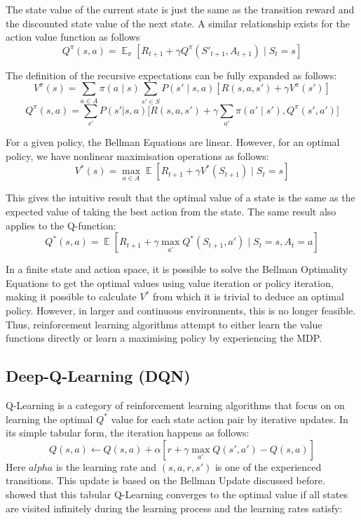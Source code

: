 \documentclass[12pt,a4paper]{report}
\DeclareMathOperator{\EX}{\mathbb{E}}
\begin{document}
The state value of the current state is just the same as the transition reward and the discounted state value of the next state. A similar relationship exists for the action value function as follows  
\[
  Q^\pi(s, a) = \EX_{\pi}[ R_{t+1} + \gamma Q^\pi(S'_{t+1}, A_{t+1}) \mid S_{t}= s]
\] \par

The definition of the recursive expectations can be fully expanded as follows:
\[
V^{\pi}(s) = \sum_{a \in A} \pi(a \mid s) \sum_{s' \in S} P(s' \mid s, a) \left[ R(s, a, s') + \gamma V^{\pi}(s') \right]
\]
\[
Q^\pi(s,a) = \sum_{s'}P(s'|s,a)\big[ R(s,a,s') + \gamma \sum_{a'}\pi(a'\mid s'),Q^\pi(s',a')\big]
\] \par

For a given policy, the Bellman Equations are linear. However, for an optimal policy, we have nonlinear maximisation operations as follows: 
\[
  V^*(s) = \max_{a \in A}\EX[ R_{t+1} + \gamma V^*(S_{t+1}) \mid S_{t}= s]
\] \par

This gives the intuitive result that the optimal value of a state is the same as the expected value of taking the best action from the state. The same result also applies to the Q-function:
\[
Q^*(s, a) = \EX [ R_{t+1} + \gamma \max_{a'} Q^*(S_{t+1}, a') \mid S_t = s, A_t = a ]
\] \par

In a finite state and action space, it is possible to solve the Bellman Optimality Equations to get the optimal values using value iteration or policy iteration, making it possible to calculate $V^*$ from which it is trivial to deduce an optimal policy. However, in larger and continuous environments, this is no longer feasible. Thus, reinforcement learning algorithms attempt to either learn the value functions directly or learn a maximising policy by experiencing the MDP. \par

\subsection{Deep-Q-Learning (DQN)}

Q-Learning is a category of reinforcement learning algorithms that focus on on learning the optimal $Q^*$ value for each state action pair by iterative updates. In its simple tabular form, the iteration happens as follows:
\[Q(s, a) \leftarrow Q(s, a) + \alpha [ r + \gamma \max_{a'} Q(s', a') - Q(s, a) ]\]
Here $alpha$ is the learning rate and $(s,a,r,s')$ is one of the experienced transitions. This update is based on the Bellman Update discussed before. \cite{Watkins1992} showed that this tabular Q-Learning converges to the optimal value if all states are visited infinitely during the learning process and the learning rates satisfy: 
\end{document}
